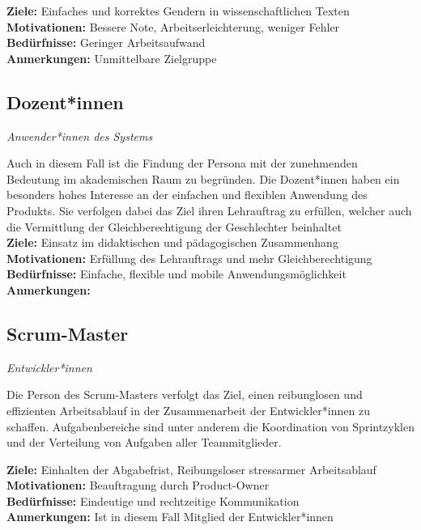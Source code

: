 \documentclass[paper=a4, parskip=half]{scrreprt}
\begin{document}
\textbf{Ziele:} Einfaches und korrektes Gendern in wissenschaftlichen Texten \\
\textbf{Motivationen:} Bessere Note, Arbeitserleichterung, weniger Fehler\\
\textbf{Bedürfnisse:} Geringer Arbeitsaufwand\\
\textbf{Anmerkungen:} Unmittelbare Zielgruppe\\

\subsection{Dozent*innen}
\vspace{-0.5cm}\textit{Anwender*innen des Systems}

Auch in diesem Fall ist die Findung der Persona mit der zunehmenden Bedeutung im akademischen Raum zu begründen. Die Dozent*innen haben ein besonders hohes Interesse an der einfachen und flexiblen Anwendung des Produkts.
Sie verfolgen dabei das Ziel ihren Lehrauftrag zu erfüllen, welcher auch die Vermittlung der Gleichberechtigung der Geschlechter beinhaltet\\

\textbf{Ziele:} Einsatz im didaktischen und pädagogischen Zusammenhang\\
\textbf{Motivationen:} Erfüllung des Lehrauftrags und mehr Gleichberechtigung\\
\textbf{Bedürfnisse:} Einfache, flexible und mobile Anwendungsmöglichkeit\\
\textbf{Anmerkungen:}\\

\subsection{Scrum-Master}
\vspace{-0.5cm}\textit{Entwickler*innen}

Die Person des Scrum-Masters verfolgt das Ziel, einen reibunglosen und effizienten Arbeitsablauf in der Zusammenarbeit der Entwickler*innen zu schaffen.
Aufgabenbereiche sind unter anderem die Koordination von Sprintzyklen und der Verteilung von Aufgaben aller Teammitglieder.

\textbf{Ziele:} Einhalten der Abgabefrist, Reibungsloser stressarmer Arbeitsablauf\\
\textbf{Motivationen:} Beauftragung durch Product-Owner\\
\textbf{Bedürfnisse:} Eindeutige und rechtzeitige Kommunikation\\
\textbf{Anmerkungen:} Ist in diesem Fall Mitglied der Entwickler*innen\\
\end{document}
